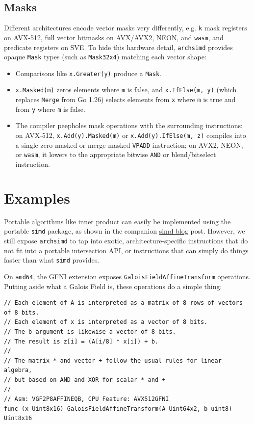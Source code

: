 \documentclass[11pt,a4paper]{article}
\begin{document}
\subsection{Masks}

Different architectures encode vector masks very differently, e.g. \texttt{k} mask registers on AVX-512, full vector bitmasks on AVX/AVX2, NEON, and \texttt{wasm}, and predicate registers on SVE. To hide this hardware detail, \texttt{archsimd} provides opaque \texttt{Mask} types (such as \texttt{Mask32x4}) matching each vector shape:

\begin{itemize}
\item Comparisons like \texttt{x.Greater(y)} produce a \texttt{Mask}.
\item \texttt{x.Masked(m)} zeros elements where \texttt{m} is false, and \texttt{x.IfElse(m, y)} (which replaces \texttt{Merge} from Go 1.26) selects elements from \texttt{x} where \texttt{m} is true and from \texttt{y} where \texttt{m} is false.
\item The compiler peepholes mask operations with the surrounding instructions: on AVX-512, \texttt{x.Add(y).Masked(m)} or \texttt{x.Add(y).IfElse(m, z)} compiles into a single zero-masked or merge-masked \texttt{VPADD} instruction; on AVX2, NEON, or \texttt{wasm}, it lowers to the appropriate bitwise \texttt{AND} or blend/bitselect instruction.
\end{itemize}

\section{Examples}

Portable algorithms like inner product can easily be implemented using the portable \texttt{simd} package, as shown in the companion \href{https://go.dev/blog/simd-experiment}{simd blog} post. However, we still expose \texttt{archsimd} to tap into exotic, architecture-specific instructions that do not fit into a portable intersection API, or instructions that can simply do things faster than what \texttt{simd} provides.

On \texttt{amd64}, the GFNI extension exposes \texttt{GaloisFieldAffineTransform} operations. Putting aside what a Galois Field is, these operations do a simple thing:

\begin{verbatim}
// Each element of A is interpreted as a matrix of 8 rows of vectors of 8 bits.
// Each element of x is interpreted as a vector of 8 bits.
// The b argument is likewise a vector of 8 bits.
// The result is z[i] = (A[i/8] * x[i]) + b.
//
// The matrix * and vector + follow the usual rules for linear algebra,
// but based on AND and XOR for scalar * and +
//
// Asm: VGF2P8AFFINEQB, CPU Feature: AVX512GFNI
func (x Uint8x16) GaloisFieldAffineTransform(A Uint64x2, b uint8) Uint8x16
\end{verbatim}
\end{document}
